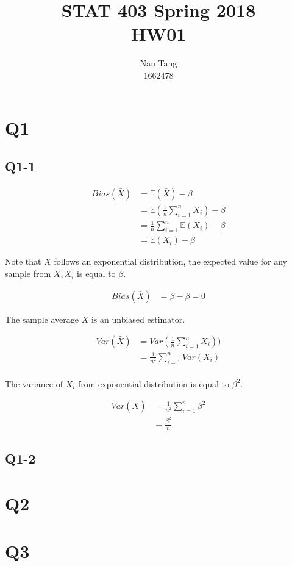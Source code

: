 \documentclass[12pt,letterpaper]{article}
\author{Nan Tang\\1662478}
\title{STAT 403 Spring 2018\\HW01}
\begin{document}
\maketitle

\section{Q1}

\subsection{Q1-1}


\begin{align*}
Bias(\bar{X}) &= \mathbb{E}(\bar{X}) - \beta \\
&= \mathbb{E}(\frac{1}{n} \sum_{i=1}^{n}X_i) - \beta\\
&= \frac{1}{n} \sum_{i=1}^{n} \mathbb{E}(X_i) - \beta \\
&= \mathbb{E}(X_i) - \beta
\end{align*}

Note that $X$ follows an exponential distribution, the expected value for any sample from $X, X_i$ is equal to $\beta$.

\begin{align*}
Bias(\bar{X}) &= \beta - \beta = 0
\end{align*}

The sample average $\bar{X}$ is an unbiased estimator.

\begin{align*}
Var(\bar{X}) &= Var(\frac{1}{n} \sum_{i=1}^{n}X_i)) \\
&= \frac{1}{n^2} \sum_{i=1}^{n} Var(X_i) \\
\end{align*}

The variance of $X_i$ from exponential distribution is equal to $\beta^2$.

\begin{align*}
Var(\bar{X}) &= \frac{1}{n^2} \sum_{i=1}^{n} \beta^2 \\
&= \frac{\beta^2}{n}
\end{align*}



\subsection{Q1-2}



\section{Q2}


\section{Q3}




\end{document}
